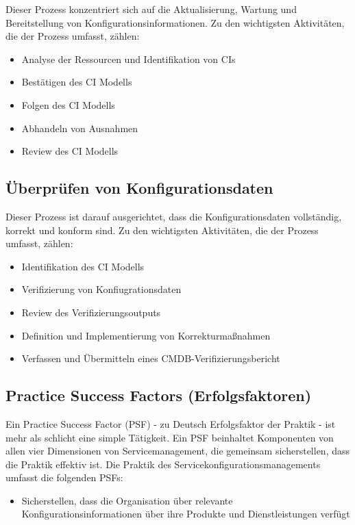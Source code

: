 Dieser Prozess konzentriert sich auf die Aktualisierung, Wartung und Bereitstellung von Konfigurationsinformationen.
Zu den wichtigsten Aktivitäten, die der Prozess umfasst, zählen:

\begin{itemize}
	\item Analyse der Ressourcen und Identifikation von CIs
	\item Bestätigen des CI Modells
	\item Folgen des CI Modells
	\item Abhandeln von Ausnahmen
	\item Review des CI Modells
\end{itemize}

\subsection*{Überprüfen von Konfigurationsdaten}

Dieser Prozess ist darauf ausgerichtet, dass die Konfigurationsdaten vollständig, korrekt und konform sind.
Zu den wichtigsten Aktivitäten, die der Prozess umfasst, zählen:

\begin{itemize}
	\item Identifikation des CI Modells
	\item Verifizierung von Konfiugrationsdaten
	\item Review des Verifizierungsoutputs
	\item Definition und Implementierung von Korrekturmaßnahmen
	\item Verfassen und Übermitteln eines CMDB-Verifizierungsbericht
\end{itemize}

\subsection{Practice Success Factors (Erfolgsfaktoren)}
Ein Practice Success Factor (PSF) - zu Deutsch Erfolgsfaktor der Praktik -
ist mehr als schlicht eine simple Tätigkeit. Ein PSF beinhaltet Komponenten
von allen vier Dimensionen von Servicemanagement, die gemeinsam sicherstellen,
dass die Praktik effektiv ist. Die Praktik des Servicekonfigurationsmanagements umfasst die folgenden PSFs:

\begin{itemize}
	\item Sicherstellen, dass die Organisation über relevante Konfigurationsinformationen über ihre Produkte und Dienstleistungen verfügt
\end{itemize}

